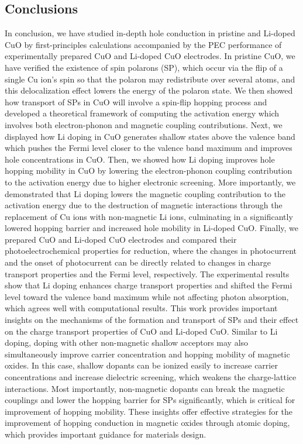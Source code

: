 \subsection{Conclusions}
In conclusion, we have studied in-depth hole conduction in pristine and Li-doped CuO by first-principles calculations accompanied by the PEC performance of experimentally prepared CuO and Li-doped CuO electrodes. In pristine CuO, we have verified the existence of spin polarons (SP), which occur via the flip of a single Cu ion’s spin so that the polaron may redistribute over several atoms, and this delocalization effect lowers the energy of the polaron state. We then showed how transport of SPs in CuO will involve a spin-flip hopping process and developed a theoretical framework of computing the activation energy which involves both electron-phonon and magnetic coupling contributions. Next, we displayed how Li doping in CuO generates shallow states above the valence band which pushes the Fermi level closer to the valence band maximum and improves hole concentrations in CuO. Then, we showed how Li doping improves hole hopping mobility in CuO by lowering the electron-phonon coupling contribution to the activation energy due to higher electronic screening. More importantly, we demonstrated that Li doping lowers the magnetic coupling contribution to the activation energy due to the destruction of magnetic interactions through the replacement of Cu ions with non-magnetic Li ions, culminating in a significantly lowered hopping barrier and increased hole mobility in Li-doped CuO. Finally, we prepared CuO and Li-doped CuO electrodes and compared their photoelectrochemical properties for  reduction, where the changes in photocurrent and the onset of photocurrent can be directly related to changes in charge transport properties and the Fermi level, respectively.  The experimental results show that Li doping enhances charge transport properties and shifted the Fermi level toward the valence band maximum while not affecting photon absorption, which agrees well with computational results. This work provides important insights on the mechanisms of the formation and transport of SPs and their effect on the charge transport properties of CuO and Li-doped CuO.  Similar to Li doping, doping with other non-magnetic shallow acceptors may also simultaneously improve carrier concentration and hopping mobility of magnetic oxides. In this case, shallow dopants can be ionized easily to increase carrier concentrations and increase dielectric screening, which weakens the charge-lattice interactions. Most importantly, non-magnetic dopants can break the magnetic couplings and lower the hopping barrier for SPs significantly, which is critical for improvement of hopping mobility.  These insights offer effective strategies for the improvement of hopping conduction in magnetic oxides through atomic doping, which provides important guidance for materials design.

